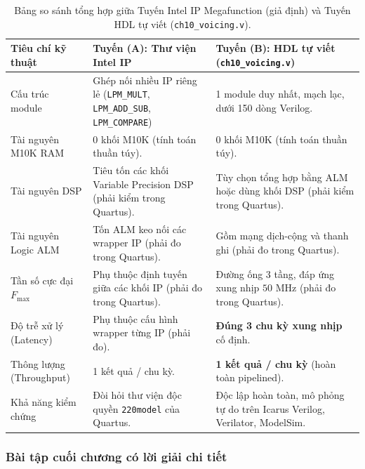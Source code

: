 \begin{table}[htbp]
\centering
\small
\caption{Bảng so sánh tổng hợp giữa Tuyến Intel IP Megafunction (giả định) và Tuyến HDL tự viết (\texttt{ch10\_voicing.v}).}
\label{tab:ch10_ip_vs_hdl}
\begin{tabular}{p{3.5cm}p{5.5cm}p{5.8cm}}
\toprule
\textbf{Tiêu chí kỹ thuật} & \textbf{Tuyến (A): Thư viện Intel IP} & \textbf{Tuyến (B): HDL tự viết (\texttt{ch10\_voicing.v})} \\
\midrule
Cấu trúc module & Ghép nối nhiều IP riêng lẻ (\texttt{LPM\_MULT}, \texttt{LPM\_ADD\_SUB}, \texttt{LPM\_COMPARE}) & 1 module duy nhất, mạch lạc, dưới 150 dòng Verilog. \\
Tài nguyên M10K RAM & 0 khối M10K (tính toán thuần túy). & 0 khối M10K (tính toán thuần túy). \\
Tài nguyên DSP & Tiêu tốn các khối Variable Precision DSP (phải kiểm trong Quartus). & Tùy chọn tổng hợp bằng ALM hoặc dùng khối DSP (phải kiểm trong Quartus). \\
Tài nguyên Logic ALM & Tốn ALM keo nối các wrapper IP (phải đo trong Quartus). & Gồm mạng dịch-cộng và thanh ghi (phải đo trong Quartus). \\
Tần số cực đại $F_{\max}$ & Phụ thuộc định tuyến giữa các khối IP (phải đo trong Quartus). & Đường ống 3 tầng, đáp ứng xung nhịp $50\text{ MHz}$ (phải đo trong Quartus). \\
Độ trễ xử lý (Latency) & Phụ thuộc cấu hình wrapper từng IP (phải đo). & \textbf{Đúng 3 chu kỳ xung nhịp} cố định. \\
Thông lượng (Throughput) & 1 kết quả / chu kỳ. & \textbf{1 kết quả / chu kỳ} (hoàn toàn pipelined). \\
Khả năng kiểm chứng & Đòi hỏi thư viện độc quyền \texttt{220model} của Quartus. & Độc lập hoàn toàn, mô phỏng tự do trên Icarus Verilog, Verilator, ModelSim. \\
\bottomrule
\end{tabular}
\end{table}

\subsubsection*{Bài tập cuối chương có lời giải chi tiết}

